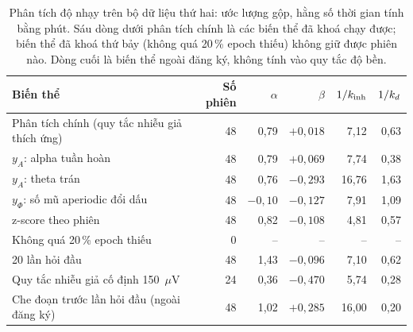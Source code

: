 \begin{table}[H]
\centering\footnotesize
\caption{Phân tích độ nhạy trên bộ dữ liệu thứ hai: ước lượng gộp, hằng số thời gian tính bằng phút. Sáu dòng dưới phân tích chính là các biến thể đã khoá chạy được; biến thể đã khoá thứ bảy (không quá 20\,\% epoch thiếu) không giữ được phiên nào. Dòng cuối là biến thể ngoài đăng ký, không tính vào quy tắc độ bền.}
\label{tab:osf-sens}
\setlength{\tabcolsep}{4pt}
\begin{tabular}{lrrrrr}
\toprule
Biến thể & Số phiên & $\alpha$ & $\beta$ & $1/k_{\mathrm{inh}}$ & $1/k_{d}$ \\
\midrule
Phân tích chính (quy tắc nhiễu giả thích ứng) & 48 & 0,79 & $+0{,}018$ & 7,12 & 0,63 \\
\midrule
$y_A$: alpha tuần hoàn                       & 48 & 0,79 & $+0{,}069$ & 7,74 & 0,38 \\
$y_A$: theta trán                            & 48 & 0,76 & $-0{,}293$ & 16,76 & 1,63 \\
$y_\Phi$: số mũ aperiodic đổi dấu            & 48 & $-0{,}10$ & $-0{,}127$ & 7,91 & 1,09 \\
z-score theo phiên                           & 48 & 0,82 & $-0{,}108$ & 4,81 & 0,57 \\
Không quá 20\,\% epoch thiếu                 &  0 & -- & -- & -- & -- \\
20 lần hỏi đầu                               & 48 & 1,43 & $-0{,}096$ & 7,10 & 0,62 \\
Quy tắc nhiễu giả cố định 150~$\mu$V         & 24 & 0,36 & $-0{,}470$ & 5,74 & 0,28 \\
\midrule
Che đoạn trước lần hỏi đầu (ngoài đăng ký)   & 48 & 1,02 & $+0{,}285$ & 16,00 & 0,20 \\
\bottomrule
\end{tabular}
\end{table}

